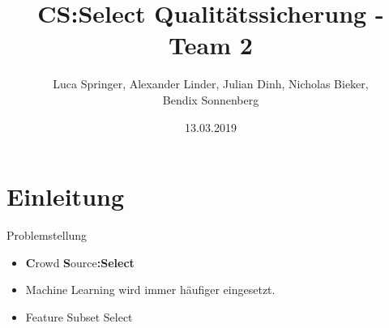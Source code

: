 \documentclass[xcolor=dvipsnames]{beamer}
\title[Team 2 - Implementierung]{CS:Select Qualitätssicherung - Team 2}
\author{Luca Springer, Alexander Linder, Julian Dinh, Nicholas Bieker,\\ Bendix Sonnenberg}
\date{13.03.2019}
\begin{document}
    \begin{frame} %
        \titlepage
    \end{frame}

    \section{Einleitung}

    \begin{frame}{Problemstellung}
        \begin{itemize}
            \item \textbf{C}rowd \textbf{S}ource\textbf{:Select}
            \item Machine Learning wird immer häufiger eingesetzt.
            \item Feature Subset Select
        \end{itemize}
    \end{frame}
    
\end{document}
